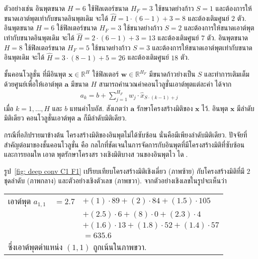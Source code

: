 ตัวอย่างเช่น 
อินพุตขนาด $H = 6$ ใช้ฟิลเตอร์ขนาด $H_F = 3$ ใช้ขนาดย่างก้าว $S = 1$
และต้องการให้ขนาดเอาต์พุตเท่ากับขนาดอินพุตเดิม
จะได้ $\hat{H} = 1 \cdot (6 - 1) + 3 = 8$ และต้องเติมศูนย์ $2$ ตัว.
%
อินพุตขนาด $H = 6$ ใช้ฟิลเตอร์ขนาด $H_F = 3$ ใช้ขนาดย่างก้าว $S = 2$
และต้องการให้ขนาดเอาต์พุตเท่ากับขนาดอินพุตเดิม
จะได้ $\hat{H} = 2 \cdot (6 - 1) + 3 = 13$ และต้องเติมศูนย์ $7$ ตัว.
%
อินพุตขนาด $H = 8$ ใช้ฟิลเตอร์ขนาด $H_F = 5$ ใช้ขนาดย่างก้าว $S = 3$
และต้องการให้ขนาดเอาต์พุตเท่ากับขนาดอินพุตเดิม
จะได้ $\hat{H} = 3 \cdot (8 - 1) + 5 = 26$ และต้องเติมศูนย์ $18$ ตัว.

ชั้นคอนโวลูชั่น ที่มีอินพุต $\bm{x} \in \mathbb{R}^H$
ใช้ฟิลเตอร์ $\bm{w} \in \mathbb{R}^{H_F}$
มีขนาดก้าวย่างเป็น $S$
และทำการเติมเต็มด้วยศูนย์เพื่อให้เอาต์พุต $\bm{a}$ มีขนาด $H$
สามารถคำนวณค่าคอนโวลูชั่นเอาต์พุตแต่ละค่า
ได้จาก
\begin{eqnarray}
a_k = b + \sum_{j=1}^{H_F} w_j \cdot \hat{x}_{S \cdot (k-1)+j} 
\label{eq: deep conv simple conv}
\end{eqnarray}
เมื่อ $k = 1, \ldots, H$
และ $b$ แทนค่าไบอัส.
สังเกตว่า $\bm{a}$ รักษาโครงสร้างมิติของ $\bm{x}$ ไว้.
อินพุต $\bm{x}$ มีลำดับมิติเดียว 
คอนโวลูชั่นเอาต์พุต $\bm{a}$ ก็มีลำดับมิติเดียว.

กรณีที่อภิปรายมาข้างต้น โครงสร้างมิติของอินพุตไม่ได้ซับซ้อน นั่นคือมีเพียงลำดับมิติเดียว.
ปัจจัยที่สำคัญต่อมาของชั้นคอนโวลูชั่น คือ กลไกที่ชัดเจนในการจัดการกับอินพุตที่มีโครงสร้างมิติที่ซับซ้อน
และการยอมใหเอาตพุตรักษาโครงสรางเชิงมิติบางสวนของอินพุตไวได.

รูป~\ref{fig: deep conv C1 F1} เปรียบเทียบโครงสร้างมิติเชิงเดี่ยว (ภาพซ้าย) กับโครงสร้างมิติที่มี $2$ ชุดลำดับ (ภาพกลาง) และตัวอย่างเชิงตัวเลข (ภาพขวา).
จากตัวอย่างเชิงเลขในรูปจะเห็นว่า

\begin{tabular}{lll}
	เอาต์พุต $a_{1,1}$ &  $= 2.7$ & $+ (1) \cdot 89 + (2) \cdot 84 + (1.5) \cdot 105$ \\
	&& $+ (2.5) \cdot 6 + (8) \cdot 0 + (2.3) \cdot 4$ \\
	&& $+ (1.6) \cdot 13 + (1.8) \cdot 52 + (1.4) \cdot 57$ \\
	&& $ = 635.6$ \\
	\multicolumn{3}{l}{ซึ่งเอาต์พุตตำแหน่ง $(1,1)$ ถูกเน้นในภาพขวา.}  
\end{tabular} 


